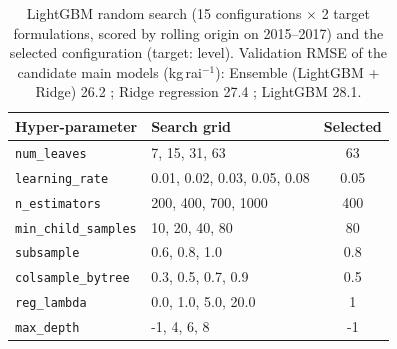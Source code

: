 \begin{table}[H]\centering\footnotesize
\caption{LightGBM random search (15 configurations $\times$ 2 target formulations, scored by rolling origin on 2015--2017) and the selected configuration (target: level). Validation RMSE of the candidate main models (kg\,rai$^{-1}$): Ensemble (LightGBM + Ridge) 26.2 ; Ridge regression 27.4 ; LightGBM 28.1.}\label{tab:hparams}
\begin{tabular}{@{}llc@{}}
\toprule
Hyper-parameter & Search grid & Selected \\
\midrule
\texttt{num\_leaves} & 7, 15, 31, 63 & 63 \\
\texttt{learning\_rate} & 0.01, 0.02, 0.03, 0.05, 0.08 & 0.05 \\
\texttt{n\_estimators} & 200, 400, 700, 1000 & 400 \\
\texttt{min\_child\_samples} & 10, 20, 40, 80 & 80 \\
\texttt{subsample} & 0.6, 0.8, 1.0 & 0.8 \\
\texttt{colsample\_bytree} & 0.3, 0.5, 0.7, 0.9 & 0.5 \\
\texttt{reg\_lambda} & 0.0, 1.0, 5.0, 20.0 & 1 \\
\texttt{max\_depth} & -1, 4, 6, 8 & -1 \\
\bottomrule
\end{tabular}
\end{table}
